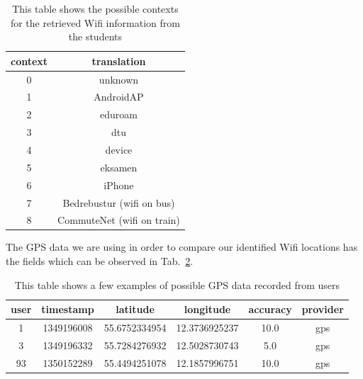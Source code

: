 \begin{table}[h]
\centering
\begin{tabular}{cc}
\hline
\textbf{context} & \textbf{translation}       \\ \hline
0                & unknown                    \\
1                & AndroidAP                  \\
2                & eduroam                    \\
3                & dtu                        \\
4                & device                     \\
5                & eksamen                    \\
6                & iPhone                     \\
7                & Bedrebustur (wifi on bus)  \\
8                & CommuteNet (wifi on train) \\ \hline
\end{tabular}
\caption{This table shows the possible contexts for the retrieved Wifi
information from the students}
\label{tab:context_translation}
\end{table}

The GPS data we are using in order to compare our identified Wifi locations has
the fields which can be observed in Tab.~\ref{tab:gps_data_fields}.

\begin{table}[h]
\begin{tabular}{cccccc}
\hline
\textbf{user} & \textbf{timestamp} & \textbf{latitude} & \textbf{longitude} & \textbf{accuracy} & \textbf{provider} \\ \hline
1             & 1349196008         & 55.6752334954     & 12.3736925237      & 10.0              & gps               \\
3             & 1349196332         & 55.7284276932     & 12.5028730743      & 5.0               & gps               \\
93            & 1350152289         & 55.4494251078     & 12.1857996751      & 10.0              & gps               \\ \hline
\end{tabular}
\caption{This table shows a few examples of possible GPS data recorded from
users}
\label{tab:gps_data_fields}
\end{table}

